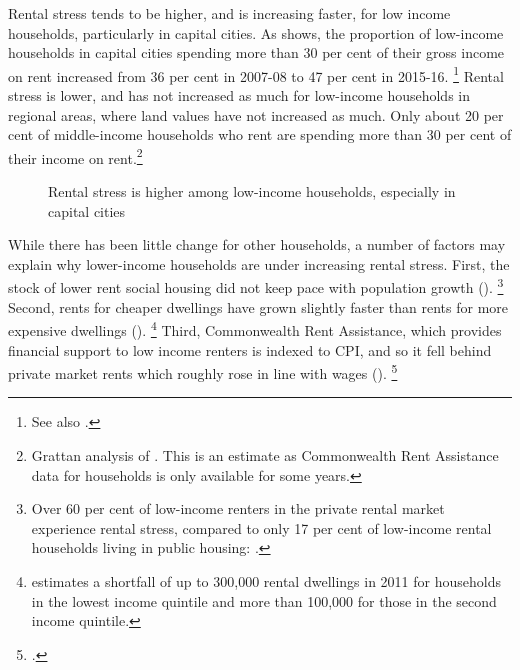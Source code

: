 Rental stress tends to be higher, and is increasing faster, for low income households, particularly in capital cities. 
As  shows, the proportion of low-income households in capital cities spending more than 30 per cent of their gross income on rent increased from 36 per cent in 2007-08 to 47 per cent in 2015-16.%
	\footnote{See also \textcite{Yates2016why}.}
Rental stress is lower, and has not increased as much for low-income households in regional areas, where land values have not increased as much. Only about 20 per cent of middle-income households who rent are spending more than 30 per cent of their income on rent.\footnote{Grattan analysis of \textcite{ABS-HES-201516-Microdata}. This is an estimate as Commonwealth Rent Assistance data for households is only available for some years.}

\begin{figure}
\caption{Rental stress is higher among low-income households, especially in capital cities}\label{fig:rental-stress-by-area}
{\textcite{ABS-201516-occupancy-and-costs}}
\end{figure}

While there has been little change for other households, 
a number of factors may explain why
lower-income households are under increasing rental stress.
First, the stock of lower rent social housing did not keep pace with population growth ().%
    \footnote{Over 60 per cent of low-income renters in the private rental market experience rental stress, compared to only 17 per cent of low-income rental households living in public housing: 	\textcite[][10]{Council-Fed-Fin-Relations-2016-Innovative-models-to-improve-supply-affordable-housing}.}
Second, rents for cheaper dwellings have grown slightly faster than rents for more expensive dwellings ().%
	\footnote{\textcite[][20]{HousingAus17} estimates a shortfall of up to 300,000 rental dwellings in 2011 for households in the lowest income quintile and more than 100,000 for those in the second income quintile.}
Third, Commonwealth Rent Assistance, which provides financial support to low income renters is indexed to CPI, and so it fell behind private market rents which roughly rose in line with wages ().%
	\footcite{AHURI-2017-Private-rental-for-lower-income-households}

